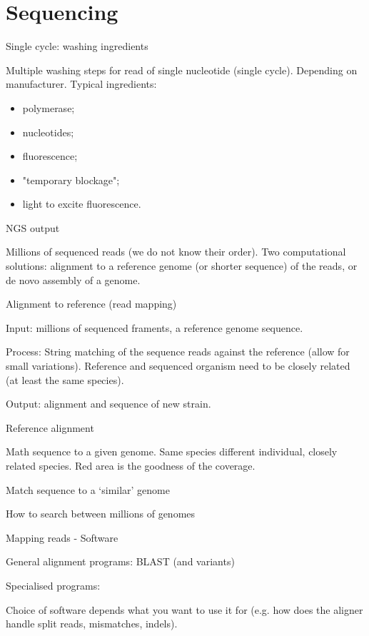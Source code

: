 \chapter{Sequencing}


{Single cycle: washing ingredients}

Multiple washing steps for read of single nucleotide (single cycle). Depending 
on manufacturer. Typical ingredients:

\begin{itemize}
\item polymerase;
\item nucleotides;
\item fluorescence;
\item "temporary blockage";
\item light to excite fluorescence.
\end{itemize}

{NGS output}

Millions of sequenced reads (we do not know their order). Two computational 
solutions: alignment to a reference genome (or shorter sequence) of the reads, 
or de novo assembly of a genome.

{Alignment to reference (read mapping)}

Input: millions of sequenced framents, a reference genome sequence.

Process: String matching of the sequence reads against the reference (allow for 
small variations). Reference and sequenced organism need to be closely related 
(at least the same species).

Output: alignment and sequence of new strain.

{Reference alignment}

Math sequence to a given genome. Same species different individual, closely 
related species. Red area is the goodness of the coverage.


Match sequence to a `similar' genome


{How to search between millions of genomes}


{Mapping reads - Software}

General alignment programs: BLAST (and variants)

Specialised programs: %

Choice of software depends what you want to use it for (e.g. how does the 
aligner handle split reads, mismatches, indels).

